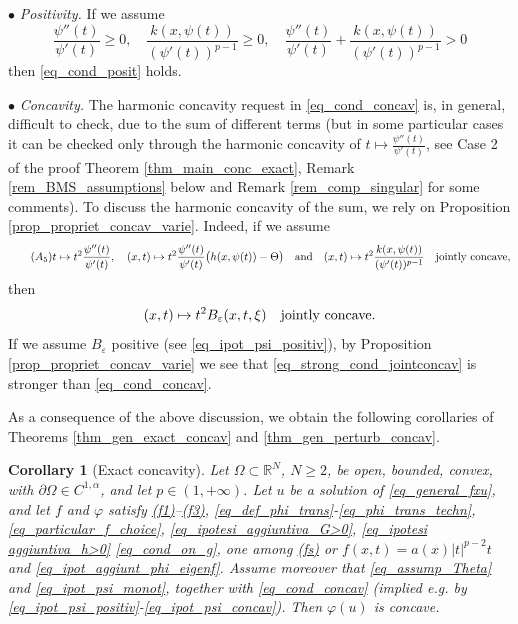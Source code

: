 \documentclass[11pt, reqno]{amsart}
\newtheorem{corollary}[lemma]{Corollary}
\theoremstyle{definition}
\numberwithin{equation}{section}
\newcommand{\R}{\mathbb{R}}
\def\eps{\varepsilon}
\begin{document}
\medskip

$\bullet$ \emph{Positivity.} If we assume
\begin{equation}\label{eq_ipot_psi_positiv}
\tag{$A_4$}
\frac{\psi''(t)}{\psi'(t)} \geq 0 , \quad \frac{k(x,\psi(t))}{(\psi'(t))^{p-1}}\geq 0, \quad \frac{\psi''(t)}{\psi'(t)} +\frac{k(x,\psi(t))}{(\psi'(t))^{p-1}}> 0
\end{equation}
then \eqref{eq_cond_posit} holds.

\medskip

$\bullet$ \emph{Concavity.} 
The harmonic concavity request in \eqref{eq_cond_concav} is, in general, difficult to check, due to the sum of different terms (but in some particular cases it can be checked only through the harmonic concavity of $ t \mapsto \frac{\psi''(t)}{\psi'(t)} $, see Case 2 of the proof Theorem \ref{thm_main_conc_exact}, Remark \ref{rem_BMS_assumptions} below and Remark \ref{rem_comp_singular} for some comments). 
To discuss the harmonic concavity of the sum, we rely on Proposition \ref{prop_propriet_concav_varie}. 
Indeed, if we assume
\begin{equation}\label{eq_ipot_psi_concav}
\tag{$A_5$}
 t \mapsto t^2 \frac{\psi''(t)}{\psi'(t)}, \quad (x,t) \mapsto t^2 \frac{\psi''(t)}{\psi'(t)} \big(h(x,\psi(t))-\Theta \big) \quad \hbox{and} \quad (x,t) \mapsto t^2 \frac{k(x,\psi(t))}{(\psi'(t))^{p-1}} \quad \hbox{jointly concave},
\end{equation}
then
\begin{equation}\label{eq_strong_cond_jointconcav}
(x,t) \mapsto t^2 B_{\eps}(x,t,\xi) \quad \hbox{jointly concave}.
\end{equation}
If we assume $B_{\eps}$ positive (see \eqref{eq_ipot_psi_positiv}), by Proposition \ref{prop_propriet_concav_varie} we see that \eqref{eq_strong_cond_jointconcav} is stronger than \eqref{eq_cond_concav}.

\smallskip

As a consequence of the above discussion, we obtain the following corollaries of Theorems \ref{thm_gen_exact_concav} and \ref{thm_gen_perturb_concav}.

\begin{corollary}[Exact concavity] 
\label{corol_gen_exact_concav}
Let $\Omega \subset \R^N$, $N\geq 2$, be open, bounded, convex, with $\partial \Omega \in C^{1,\alpha}$,
and let $p\in (1,+\infty)$.
Let $u$ be a solution of \eqref{eq_general_fxu}, and let $f$ and $\varphi$ satisfy \hyperlink{(f1)}{\rm{(f1)}}--\hyperlink{(f3)}{\rm{(f3)}}, \eqref{eq_def_phi_trans}-\eqref{eq_phi_trans_techn},
\eqref{eq_particular_f_choice}, \eqref{eq_ipotesi_aggiuntiva_G>0}, \eqref{eq_ipotesi aggiuntiva_h>0} \eqref{eq_cond_on_g}, one among \hyperlink{(fs)}{\rm{(fs)}} or $f(x,t) = a(x) |t|^{p-2} t$ and \eqref{eq_ipot_aggiunt_phi_eigenf}.
Assume moreover that \eqref{eq_assump_Theta} and \eqref{eq_ipot_psi_monot}, together with \eqref{eq_cond_concav} (implied e.g. by \eqref{eq_ipot_psi_positiv}-\eqref{eq_ipot_psi_concav}). 
Then $\varphi(u)$ is concave.
\end{corollary}
\end{document}
